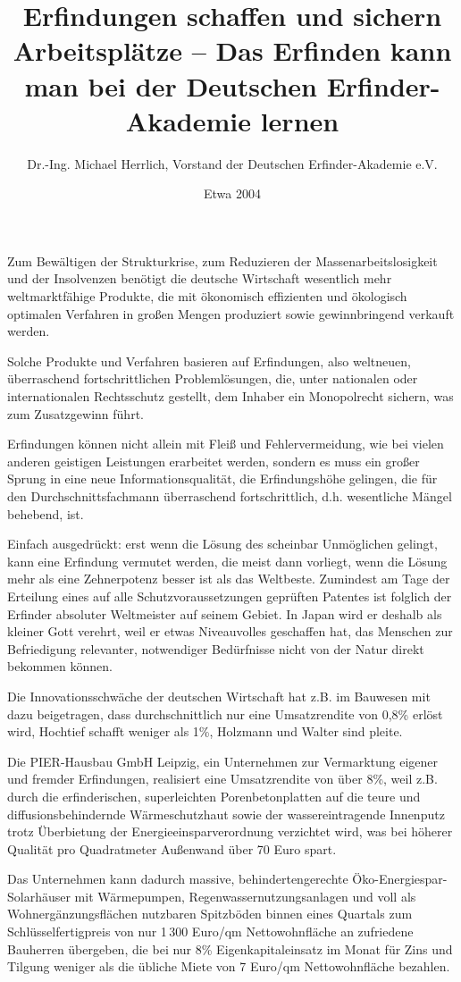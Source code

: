 \documentclass[11pt,a4paper]{article}
\title{Erfindungen schaffen und sichern Arbeitsplätze -- Das Erfinden kann man
  bei der Deutschen Erfinder-Akademie lernen}
\author{Dr.-Ing. Michael Herrlich, Vorstand der Deutschen Erfinder-Akademie
  e.V.}
\date{Etwa 2004}
\begin{document}
\maketitle
 
Zum Bewältigen der Strukturkrise, zum Reduzieren der Massenarbeitslosigkeit
und der Insolvenzen benötigt die deutsche Wirtschaft wesentlich mehr
weltmarktfähige Produkte, die mit ökonomisch effizienten und ökologisch
optimalen Verfahren in großen Mengen produziert sowie gewinnbringend verkauft
werden.

Solche Produkte und Verfahren basieren auf Erfindungen, also weltneuen,
überraschend fortschrittlichen Problemlösungen, die, unter nationalen oder
internationalen Rechtsschutz gestellt, dem Inhaber ein Monopolrecht sichern,
was zum Zusatzgewinn führt.

Erfindungen können nicht allein mit Fleiß und Fehlervermeidung, wie bei vielen
anderen geistigen Leistungen erarbeitet werden, sondern es muss ein großer
Sprung in eine neue Informationsqualität, die Erfindungshöhe gelingen, die für
den Durchschnittsfachmann überraschend fortschrittlich, d.h. wesentliche
Mängel behebend, ist.

Einfach ausgedrückt: erst wenn die Lösung des scheinbar Unmöglichen gelingt,
kann eine Erfindung vermutet werden, die meist dann vorliegt, wenn die Lösung
mehr als eine Zehnerpotenz besser ist als das Weltbeste. Zumindest am Tage der
Erteilung eines auf alle Schutzvoraussetzungen geprüften Patentes ist folglich
der Erfinder absoluter Weltmeister auf seinem Gebiet. In Japan wird er deshalb
als kleiner Gott verehrt, weil er etwas Niveauvolles geschaffen hat, das
Menschen zur Befriedigung relevanter, notwendiger Bedürfnisse nicht von der
Natur direkt bekommen können.

Die Innovationsschwäche der deutschen Wirtschaft hat z.B. im Bauwesen mit dazu
beigetragen, dass durchschnittlich nur eine Umsatzrendite von 0{,}8\% erlöst
wird, Hochtief schafft weniger als 1\%, Holzmann und Walter sind pleite.

Die PIER-Hausbau GmbH Leipzig, ein Unternehmen zur Vermarktung eigener und
fremder Erfindungen, realisiert eine Umsatzrendite von über 8\%, weil
z.B. durch die erfinderischen, superleichten Porenbetonplatten auf die teure
und diffusionsbehindernde Wärmeschutzhaut sowie der wassereintragende
Innenputz trotz Überbietung der Energieeinsparverordnung verzichtet wird, was
bei höherer Qualität pro Quadratmeter Außenwand über 70 Euro spart.

Das Unternehmen kann dadurch massive, behindertengerechte
Öko-Energiespar-Solarhäuser mit Wärmepumpen, Regenwassernutzungsanlagen und
voll als Wohnergänzungsflächen nutzbaren Spitzböden binnen eines Quartals zum
Schlüsselfertigpreis von nur 1\,300 Euro/qm Nettowohnfläche an zufriedene
Bauherren übergeben, die bei nur 8\% Eigenkapitaleinsatz im Monat für Zins und
Tilgung weniger als die übliche Miete von 7 Euro/qm Nettowohnfläche bezahlen.
\end{document}
